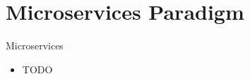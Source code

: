\documentclass{beamer}
\begin{document}

\section{Microservices Paradigm}


\begin{frame}{Microservices}

\begin{itemize}
  \item TODO
\end{itemize}

\end{frame}

\end{document}
